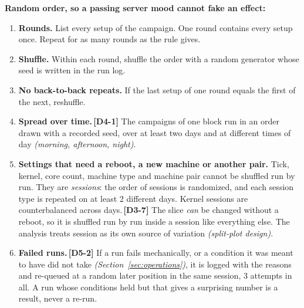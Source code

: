 \documentclass[11pt]{article}
\newcommand{\gl}[1]{{\color{soft}\itshape\small (#1)}}
\newcommand{\chgold}[1]{\,{\color{oldcol}\bfseries\footnotesize[#1]}}
\begin{document}
\textbf{Random order, so a passing server mood cannot fake an effect:}
\begin{enumerate}
  \item \textbf{Rounds.} List every setup of the campaign. One round contains every setup once. Repeat for as many rounds as the rule gives.
  \item \textbf{Shuffle.} Within each round, shuffle the order with a random generator whose seed is written in the run log.
  \item \textbf{No back-to-back repeats.} If the last setup of one round equals the first of the next, reshuffle.
  \item \textbf{Spread over time.}\chgold{D4-1} The campaigns of one block run in an order drawn with a recorded seed, over at least two days and at different times of day \gl{morning, afternoon, night}.
  \item \textbf{Settings that need a reboot, a new machine or another pair.} Tick, kernel, core count, machine type and machine pair cannot be shuffled run by run. They are \emph{sessions}: the order of sessions is randomized, and each session type is repeated on at least 2 different days. Kernel sessions are counterbalanced across days.\chgold{D3-7} The slice \emph{can} be changed without a reboot, so it is shuffled run by run inside a session like everything else. The analysis treats session as its own source of variation \gl{split-plot design}.
  \item \textbf{Failed runs.}\chgold{D5-2} If a run fails mechanically, or a condition it was meant to have did not take \gl{Section~\ref{sec:operations}}, it is logged with the reasons and re-queued at a random later position in the same session, 3 attempts in all. A run whose conditions held but that gives a surprising number is a result, never a re-run.
\end{enumerate}
\end{document}
